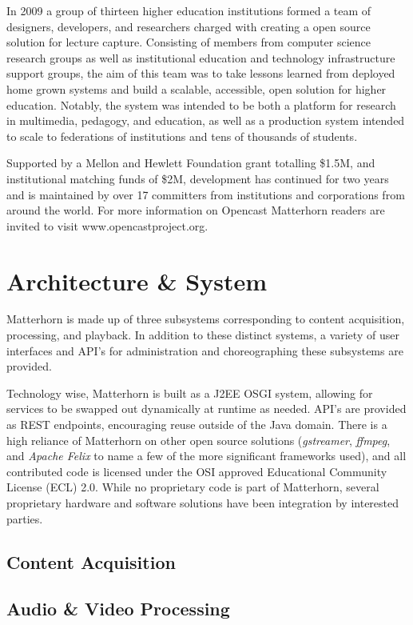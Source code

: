 \documentclass{sig-alternate}
\begin{document}
In 2009 a group of thirteen higher education institutions formed a team of designers, developers, and researchers charged with creating a open source solution for lecture capture.  Consisting of members from computer science research groups as well as institutional education and technology infrastructure support groups, the aim of this team was to take lessons learned from deployed home grown systems and build a scalable, accessible, open solution for higher education.  Notably, the system was intended to be both a platform for research in multimedia, pedagogy, and education, as well as a production system intended to scale to federations of institutions and tens of thousands of students.

Supported by a Mellon and Hewlett Foundation grant totalling \$1.5M, and institutional matching funds of \$2M, development has continued for two years and is maintained by over 17 committers from institutions and corporations from around the world.  For more information on Opencast Matterhorn readers are invited to visit www.opencastproject.org.

\section{Architecture \& System}
Matterhorn is made up of three subsystems corresponding to content acquisition, processing, and playback.  In addition to these distinct systems, a variety of user interfaces and API's for administration and choreographing these subsystems are provided.  

Technology wise, Matterhorn is built as a J2EE OSGI system, allowing for services to be swapped out dynamically at runtime as needed.  API's are provided as REST endpoints, encouraging reuse outside of the Java domain.  There is a high reliance of Matterhorn on other open source solutions (\emph{gstreamer}, \emph{ffmpeg}, and \emph{Apache Felix} to name a few of the more significant frameworks used), and all contributed code is licensed under the OSI approved Educational Community License (ECL) 2.0.  While no proprietary code is part of Matterhorn, several proprietary hardware and software solutions have been integration by interested parties.

\subsection{Content Acquisition}

\subsection{Audio \& Video Processing}
\end{document}
